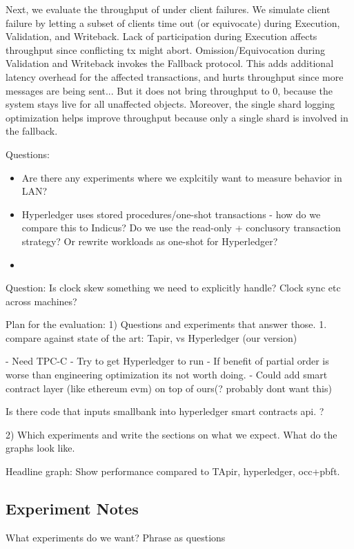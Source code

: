 Next, we evaluate the throughput of \sys under client failures. We simulate client failure by letting a subset of clients time out (or equivocate) during Execution, Validation, and Writeback. Lack of participation during Execution affects throughput since conflicting tx might abort. 
Omission/Equivocation during Validation and Writeback invokes the Fallback protocol. This adds additional latency overhead for the affected transactions, and hurts throughput since more messages are being sent... But it does not bring throughput to 0, because the system stays live for all unaffected objects. Moreover, the single shard logging optimization helps improve throughput because only a single shard is involved in the fallback.




\iffalse
Questions:
\begin{itemize}
  \item Are there any experiments where we explcitily want to measure behavior in LAN?
  \item Hyperledger uses stored procedures/one-shot transactions - how do we compare this to Indicus? Do we use the read-only + conclusory transaction strategy? Or rewrite workloads as one-shot for Hyperledger?
  \item 
\end{itemize}

Question: Is clock skew something we need to explicitly handle? Clock sync etc across machines?

Plan for the evaluation:
1) Questions and experiments that answer those.
  1. compare against state of the art: Tapir, vs Hyperledger (our version)
  

- Need TPC-C
- Try to get Hyperledger to run
- If benefit of partial order is worse than engineering optimization its not worth doing. 
- Could add smart contract layer (like ethereum evm) on top of ours(? probably dont want this)

Is there code that inputs smallbank into hyperledger smart contracts api. ?


2) Which experiments and write the sections on what we expect. What do the graphs look like.


Headline graph: Show performance compared to TApir, hyperledger, occ+pbft.

\subsection{Experiment Notes}
What experiments do we want? Phrase as questions

